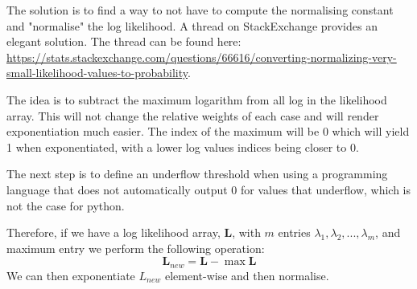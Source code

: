 \documentclass[]{article}
\renewcommand{\vec}[1]{\mathbf{#1}}
\begin{document}
The solution is to find a way to not have to compute the normalising constant and "normalise" the log likelihood. A thread on StackExchange provides an elegant solution. The thread can be found here: \url{https://stats.stackexchange.com/questions/66616/converting-normalizing-very-small-likelihood-values-to-probability}.

The idea is to subtract the maximum logarithm from all log in the likelihood array. This will not change the relative weights of each case and will render exponentiation much easier. The index of the maximum will be 0 which will yield 1 when exponentiated, with a lower log values indices being closer to 0. 

The next step is to define an underflow threshold when using a programming language that does not automatically output 0 for values that underflow, which is not the case for python.

Therefore, if we have a log likelihood array, $\vec{L}$,  with $m$ entries $\lambda_1, \lambda_2, ..., \lambda_m$, and maximum entry we perform the following operation:
\[
	\vec{L}_{new} = \vec{L} - \max \vec{L}
\]
We can then exponentiate $L_{new}$ element-wise and then normalise.
\end{document}
